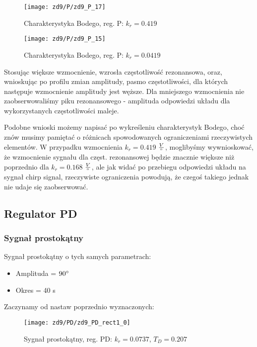 \documentclass[11 pt]{article}
\begin{document}
\begin{figure}[h!]
	\centerline{
	\texttt{[image: zd9/P/zd9\_P\_17]}
	}
	\caption{Charakterystyka Bodego, reg. P: $k_r = 0.419$}
\end{figure}

\begin{figure}[h!]
	\centerline{
	\texttt{[image: zd9/P/zd9\_P\_15]}
	}
	\caption{Charakterystyka Bodego, reg. P: $k_r = 0.0419$}
\end{figure}

\newpage

Stosując większe wzmocnienie, wzrosła częstotliwość rezonansowa, oraz, wnioskując po profilu zmian amplitudy, pasmo częstotliwości, dla których następuje wzmocnienie amplitudy jest węższe. Dla mniejszego wzmocnienia nie zaobserwowaliśmy piku rezonansowego - amplituda odpowiedzi układu dla wykorzystanych częstotliwości maleje.

Podobne wnioski możemy napisać po wykreśleniu charakterystyk Bodego, choć znów musimy pamiętać o różnicach spowodowanych ograniczeniami rzeczywistych elementów. W przypadku wzmocnienia $k_r = 0.419$ $\frac{V}{\degree}$, moglibyśmy wywnioskować, że wzmocnienie sygnału dla częst. rezonansowej będzie znacznie większe niż poprzednio dla $k_r = 0.168$ $\frac{V}{\degree}$, ale jak widać po przebiegu odpowiedzi układu na sygnał chirp signal, rzeczywiste ograniczenia powodują, że czegoś takiego jednak nie udaje się zaobserwować.

\newpage

\subsection*{Regulator PD}

\subsubsection*{Sygnał prostokątny}

Sygnał prostokątny o tych samych parametrach:

\begin{itemize}
\item[]Amplituda = $90 \degree$
\item[]Okres = 40 s
\end{itemize}

Zaczynamy od nastaw poprzednio wyznaczonych:

\begin{figure}[h!]
	\centerline{
	\texttt{[image: zd9/PD/zd9\_PD\_rect1\_0]}
	}
	\caption{Sygnał prostokątny, reg. PD: $k_r = 0.0737$, $T_D = 0.207$}
\end{figure}
\end{document}
